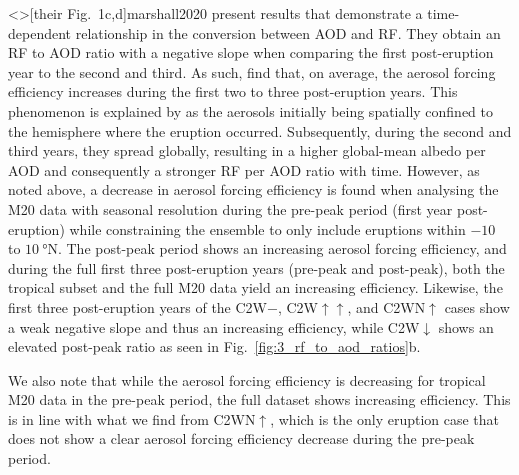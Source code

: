 \documentclass[draft]{agujournal2019}
\begin{document}
\citeA<>[their Fig.\ 1c,d]{marshall2020} present results that demonstrate a
time-dependent relationship in the conversion between AOD and RF. They obtain an RF to
AOD ratio with a negative slope when comparing the first post-eruption year to the
second and third. As such,  find that, on average, the aerosol
forcing efficiency increases during the first two to three post-eruption years. This
phenomenon is explained by  as the aerosols initially being
spatially confined to the hemisphere where the eruption occurred. Subsequently, during
the second and third years, they spread globally, resulting in a higher global-mean
albedo per AOD and consequently a stronger RF per AOD ratio with time. However, as noted
above, a decrease in aerosol forcing efficiency is found when analysing the M20 data
with seasonal resolution during the pre-peak period (first year post-eruption) while
constraining the ensemble to only include eruptions within \(-10\) to
\(\SI{10}{\degree\mathrm{N}}\). The post-peak period shows an increasing aerosol forcing
efficiency, and during the full first three post-eruption years (pre-peak and
post-peak), both the tropical subset and the full M20 data yield an increasing
efficiency. Likewise, the first three post-eruption years of the C2W\(-\),
C2W\(\uparrow\uparrow\), and C2WN\(\uparrow\) cases show a weak negative slope and thus
an increasing efficiency, while C2W\(\downarrow\) shows an elevated post-peak ratio as
seen in Fig.~\ref{fig:3_rf_to_aod_ratios}b.

We also note that while the aerosol forcing efficiency is decreasing for tropical M20
data in the pre-peak period, the full dataset shows increasing efficiency. This is in
line with what we find from C2WN\(\uparrow\), which is the only eruption case that does
not show a clear aerosol forcing efficiency decrease during the pre-peak period.
\end{document}
